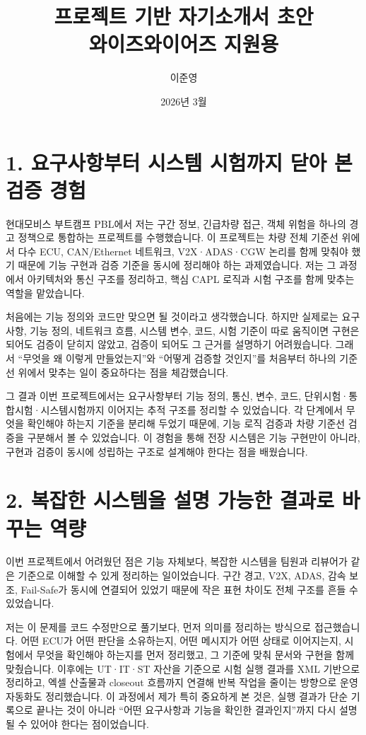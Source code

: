 \documentclass[11pt]{article}
\title{\textbf{프로젝트 기반 자기소개서 초안}\\와이즈와이어즈 지원용}
\author{이준영}
\date{2026년 3월}
\begin{document}
\maketitle

\section*{1. 요구사항부터 시스템 시험까지 닫아 본 검증 경험}
현대모비스 부트캠프 PBL에서 저는 구간 정보, 긴급차량 접근, 객체 위험을 하나의 경고 정책으로 통합하는 프로젝트를 수행했습니다. 이 프로젝트는 차량 전체 기준선 위에서 다수 ECU, CAN/Ethernet 네트워크, V2X·ADAS·CGW 논리를 함께 맞춰야 했기 때문에 기능 구현과 검증 기준을 동시에 정리해야 하는 과제였습니다. 저는 그 과정에서 아키텍처와 통신 구조를 정리하고, 핵심 CAPL 로직과 시험 구조를 함께 맞추는 역할을 맡았습니다.

처음에는 기능 정의와 코드만 맞으면 될 것이라고 생각했습니다. 하지만 실제로는 요구사항, 기능 정의, 네트워크 흐름, 시스템 변수, 코드, 시험 기준이 따로 움직이면 구현은 되어도 검증이 닫히지 않았고, 검증이 되어도 그 근거를 설명하기 어려웠습니다. 그래서 ``무엇을 왜 이렇게 만들었는지''와 ``어떻게 검증할 것인지''를 처음부터 하나의 기준선 위에서 맞추는 일이 중요하다는 점을 체감했습니다.

그 결과 이번 프로젝트에서는 요구사항부터 기능 정의, 통신, 변수, 코드, 단위시험·통합시험·시스템시험까지 이어지는 추적 구조를 정리할 수 있었습니다. 각 단계에서 무엇을 확인해야 하는지 기준을 분리해 두었기 때문에, 기능 로직 검증과 차량 기준선 검증을 구분해서 볼 수 있었습니다. 이 경험을 통해 전장 시스템은 기능 구현만이 아니라, 구현과 검증이 동시에 성립하는 구조로 설계해야 한다는 점을 배웠습니다.

\section*{2. 복잡한 시스템을 설명 가능한 결과로 바꾸는 역량}
이번 프로젝트에서 어려웠던 점은 기능 자체보다, 복잡한 시스템을 팀원과 리뷰어가 같은 기준으로 이해할 수 있게 정리하는 일이었습니다. 구간 경고, V2X, ADAS, 감속 보조, Fail-Safe가 동시에 연결되어 있었기 때문에 작은 표현 차이도 전체 구조를 흔들 수 있었습니다.

저는 이 문제를 코드 수정만으로 풀기보다, 먼저 의미를 정리하는 방식으로 접근했습니다. 어떤 ECU가 어떤 판단을 소유하는지, 어떤 메시지가 어떤 상태로 이어지는지, 시험에서 무엇을 확인해야 하는지를 먼저 정리했고, 그 기준에 맞춰 문서와 구현을 함께 맞췄습니다. 이후에는 UT·IT·ST 자산을 기준으로 시험 실행 결과를 XML 기반으로 정리하고, 엑셀 산출물과 closeout 흐름까지 연결해 반복 작업을 줄이는 방향으로 운영 자동화도 정리했습니다. 이 과정에서 제가 특히 중요하게 본 것은, 실행 결과가 단순 기록으로 끝나는 것이 아니라 ``어떤 요구사항과 기능을 확인한 결과인지''까지 다시 설명될 수 있어야 한다는 점이었습니다.
\end{document}
